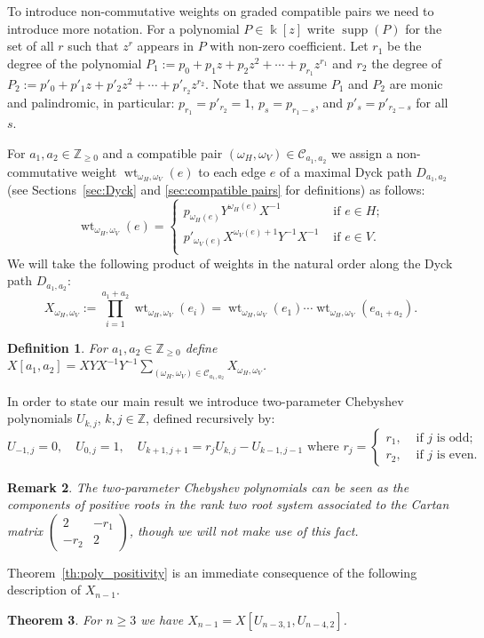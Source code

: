 \documentclass{amsart}
\newtheorem{theorem}{Theorem}[section]
\newtheorem{definition}[theorem]{Definition}
\newtheorem{remark}[theorem]{Remark}
\newcommand{\cC}{\mathcal{C}}
\newcommand{\kk}{\Bbbk}
\newcommand{\ZZ}{\mathbb{Z}}
\newcommand{\supp}{\operatorname{supp}}
\newcommand{\wt}{\operatorname{wt}}
\begin{document}
 To introduce non-commutative weights on graded compatible pairs we need to introduce more notation.  For a polynomial $P\in\kk[z]$ write $\supp(P)$ for the set of all $r$ such that $z^r$ appears in $P$ with non-zero coefficient.  Let $r_1$ be the degree of the polynomial $P_1:=p_0+p_1z+p_2z^2+\cdots+p_{r_1}z^{r_1}$ and $r_2$ the degree of $P_2:=p'_0+p'_1z+p'_2z^2+\cdots+p'_{r_2}z^{r_2}$.  Note that we assume $P_1$ and $P_2$ are monic and palindromic, in particular: $p_{r_1}=p'_{r_2}=1$, $p_s=p_{r_1-s}$, and $p'_s=p'_{r_2-s}$ for all $s$.  

 For $a_1,a_2\in\ZZ_{\ge0}$ and a compatible pair $(\omega_H,\omega_V)\in\cC_{a_1,a_2}$ we assign a non-commutative weight $\wt_{\omega_H,\omega_V}(e)$ to each edge $e$ of a maximal Dyck path $D_{a_1,a_2}$ (see Sections~\ref{sec:Dyck} and \ref{sec:compatible pairs} for definitions) as follows:
 \begin{equation}\label{eq:edge weights}
  \wt_{\omega_H,\omega_V}(e)=\begin{cases}
                    p_{\omega_H(e)}Y^{\omega_H(e)}X^{-1} & \text{ if $e\in H$;}\\
                    p'_{\omega_V(e)}X^{\omega_V(e)+1}Y^{-1}X^{-1} & \text{ if $e\in V$.}\\
                   \end{cases}
 \end{equation}
 We will take the following product of weights in the natural order along the Dyck path $D_{a_1,a_2}$:
 \[X_{\omega_H,\omega_V}:=\prod\limits_{i=1}^{a_1+a_2}\wt_{\omega_H,\omega_V}(e_i)=\wt_{\omega_H,\omega_V}(e_1)\cdots\wt_{\omega_H,\omega_V}(e_{a_1+a_2}).\]
 \begin{definition}
  For $a_1,a_2\in\ZZ_{\ge0}$ define $X[a_1,a_2]=XYX^{-1}Y^{-1}\sum\limits_{(\omega_H,\omega_V)\in\cC_{a_1,a_2}} X_{\omega_H,\omega_V}$.
 \end{definition}

 In order to state our main result we introduce two-parameter Chebyshev polynomials $U_{k,j}$, $k,j\in \ZZ$, defined recursively by: 
 \[\tag{$*$}U_{-1,j}=0, \quad U_{0,j}=1,\quad U_{k+1,j+1}=r_jU_{k,j}-U_{k-1,j-1} \text{ where $r_j=\begin{cases} r_1, & \text{ if $j$ is odd;}\\ r_2, & \text{ if $j$ is even.}\end{cases}$}\]
 \begin{remark}
  The two-parameter Chebyshev polynomials can be seen as the components of positive roots in the rank two root system associated to the Cartan matrix $\left(\begin{array}{cc}2 & -r_1\\ -r_2 & 2\end{array}\right)$, though we will not make use of this fact.
 \end{remark}
 Theorem~\ref{th:poly_positivity} is an immediate consequence of the following description of $X_{n-1}$.
 \begin{theorem}\label{th:cl_var}
  For $n\ge3$ we have $X_{n-1}=X[U_{n-3,1},U_{n-4,2}]$.
 \end{theorem}
 
\end{document}
